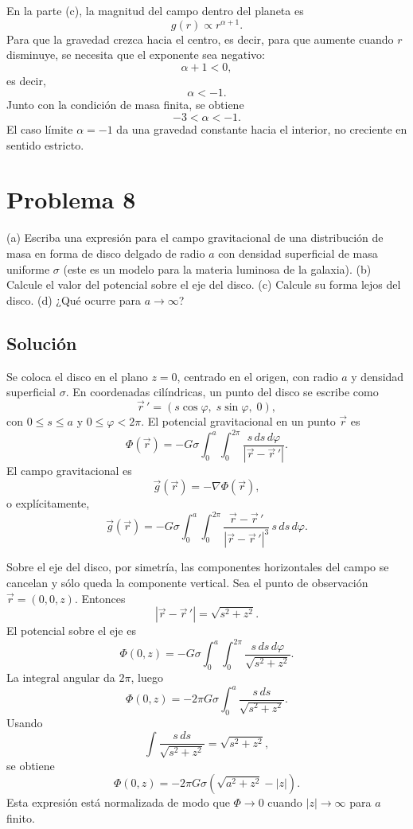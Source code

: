 \documentclass[a4paper]{article}
\begin{document}
En la parte (c), la magnitud del campo dentro del planeta es
$$
g(r)\propto r^{\alpha+1}.
$$
Para que la gravedad crezca hacia el centro, es decir, para que aumente cuando $r$ disminuye, se necesita que el exponente sea negativo:
$$
\alpha+1<0,
$$
es decir,
$$
\alpha<-1.
$$
Junto con la condición de masa finita, se obtiene
$$
\boxed{-3<\alpha<-1.}
$$
El caso límite $\alpha=-1$ da una gravedad constante hacia el interior, no creciente en sentido estricto.


\section{Problema 8}

(a) Escriba una expresión para el campo gravitacional de una distribución de masa en forma de disco delgado de radio $a$ con densidad superficial de masa uniforme $\sigma$ (este es un modelo para la materia luminosa de la galaxia).
(b) Calcule el valor del potencial sobre el eje del disco.
(c) Calcule su forma lejos del disco.
(d) ¿Qué ocurre para $a\to\infty$?

\subsection{Solución}

Se coloca el disco en el plano $z=0$, centrado en el origen, con radio $a$ y densidad superficial $\sigma$. En coordenadas cilíndricas, un punto del disco se escribe como
$$
\vec r\,'=(s\cos\varphi,\;s\sin\varphi,\;0),
$$
con $0\le s\le a$ y $0\le\varphi<2\pi$. El potencial gravitacional en un punto $\vec r$ es
$$
\Phi(\vec r)=-G\sigma\int_0^a\int_0^{2\pi}
\frac{s\,ds\,d\varphi}{|\vec r-\vec r\,'|}.
$$
El campo gravitacional es
$$
\vec g(\vec r)=-\nabla\Phi(\vec r),
$$
o explícitamente,
$$
\vec g(\vec r)=
-G\sigma\int_0^a\int_0^{2\pi}
\frac{\vec r-\vec r\,'}{|\vec r-\vec r\,'|^3}\,s\,ds\,d\varphi.
$$

Sobre el eje del disco, por simetría, las componentes horizontales del campo se cancelan y sólo queda la componente vertical. Sea el punto de observación $\vec r=(0,0,z)$. Entonces
$$
|\vec r-\vec r\,'|=\sqrt{s^2+z^2}.
$$
El potencial sobre el eje es
$$
\Phi(0,z)=-G\sigma\int_0^a\int_0^{2\pi}
\frac{s\,ds\,d\varphi}{\sqrt{s^2+z^2}}.
$$
La integral angular da $2\pi$, luego
$$
\Phi(0,z)=-2\pi G\sigma\int_0^a \frac{s\,ds}{\sqrt{s^2+z^2}}.
$$
Usando
$$
\int \frac{s\,ds}{\sqrt{s^2+z^2}}=\sqrt{s^2+z^2},
$$
se obtiene
$$
\Phi(0,z)=-2\pi G\sigma\left(\sqrt{a^2+z^2}-|z|\right).
$$
Esta expresión está normalizada de modo que $\Phi\to 0$ cuando $|z|\to\infty$ para $a$ finito.
\end{document}
